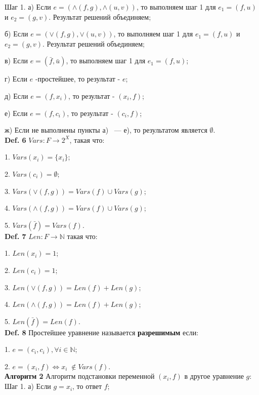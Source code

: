 \documentclass[12pt]{article}
\begin{document}
     Шаг 1. а) Если $e=(\wedge(f,g),\wedge(u,v))$, то выполняем шаг 1 для $e_{1}=(f,u)$ и $e_{2}=(g,v)$. Результат решений объединяем;
     
     б) Если $e=(\vee(f,g),\vee(u,v))$, то выполняем шаг 1 для $e_{1}=(f,u)$ и $e_{2}=(g,v)$. Результат решений объединяем;
     
     в) Если $e=(\bar f,\bar u)$, то выполняем шаг 1 для $e_{1}=(f,u)$;
     
     г) Если $e$ -простейшее, то результат - $e$;
     
     д) Если $e=(f,x_{i})$, то результат - $(x_{i}, f)$; 
     
     е) Если $e=(f,c_{i})$, то результат - $(c_{i}, f)$; 
     
     ж) Если не выполнены пункты а) ~--- \; е), то результатом является $  \emptyset $.
     \\  
        
     {\bf Def. 6} $Vars:F \rightarrow 2^{X}$, такая что:
     
     1. $Vars(x_{i})= \lbrace x_{i} \rbrace$;
     
     2. $Vars(c_{i})=  \emptyset$;
     
     3. $Vars(\vee(f,g))= Vars(f)\cup Vars(g)$;
     
     4. $Vars(\wedge(f,g))= Vars(f)\cup Vars(g)$;
     
     5. $Vars(\bar f)= Vars(f)$.
     \\
     
    {\bf Def. 7} $Len: F \longrightarrow \mathbb{N}$ такая что:
    
    1. $Len(x_{i})= 1$;
    
    2. $Len(c_{i})=  1$;
    
    3. $Len(\vee(f,g))= Len(f) + Len(g)$;
    
    4. $Len(\wedge(f,g))= Len(f) + Len(g)$;
    
    5. $Len(\bar f)= Len(f)$.    
    \\
     
     {\bf Def. 8} Простейшее уравнение называется {\bf разрешимым} если:
     
     1. $e =(c_{i},c_{i}), \forall i \in \mathbb{N}$;
     
     2. $e =(x_{i},f) \Leftrightarrow x_{i} \;\notin Vars(f)$.
     \\
     
    \hypertarget{a2}{{\bf Алгоритм 2}} Алгоритм подстановки переменной $ (x_{i},f) $ в другое уравнение $g$: 
    \\
    Шаг 1. а) Если $g = x_{i}$, то ответ  $f$;
    
\end{document}
